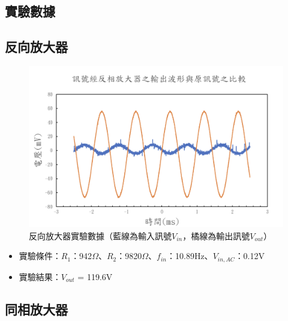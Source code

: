 \documentclass[12pt,a4paper]{article}
\begin{document}
\begin{CJK}{UTF8}{bkai}

\section{實驗數據}\label{sec:result}
\hfill

\subsection{反向放大器}\label{subsec:result_1}
\hfill

\begin{figure}[h]
    \centering
    \includegraphics[width=0.7\linewidth]{figures/exp_1_result.png}
    \caption{反向放大器實驗數據（藍線為輸入訊號$V_{in}$，橘線為輸出訊號$V_{out}$）}
    \label{fig:exp_1_result}
\end{figure}

\begin{itemize}
    \item 實驗條件：$R_1$：942$\Omega$、$R_2$：9820$\Omega$、$f_{in}$：10.89Hz、$V_{in, AC}$：0.12V
    \item 實驗結果：$V_{out}$ = 119.6V
\end{itemize}

\subsection{同相放大器}\label{subsec:result_2}
\hfill


\end{CJK}
\end{document}

